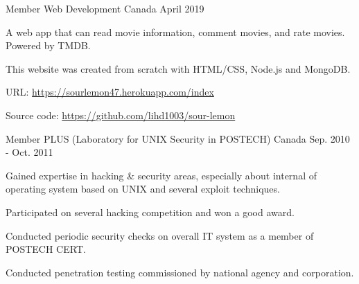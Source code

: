 \begin{cventries}

  \cventry
    {Member} %
    {Web Development} %
    {Canada} %
    {April 2019} %
    {
      \begin{cvitems} %
        \item {A web app that can read movie information, comment movies, and rate movies. Powered by TMDB. }
        \item {This website was created from scratch with HTML/CSS, Node.js and MongoDB.}
        \item {URL: \url{https://sourlemon47.herokuapp.com/index}}
        \item {Source code: \url{https://github.com/lihd1003/sour-lemon}}
      \end{cvitems}
    }

  \cventry
    {Member} %
    {PLUS (Laboratory for UNIX Security in POSTECH)} %
    {Canada} %
    {Sep. 2010 - Oct. 2011} %
    {
      \begin{cvitems} %
        \item {Gained expertise in hacking \& security areas, especially about internal of operating system based on UNIX and several exploit techniques.}
        \item {Participated on several hacking competition and won a good award.}
        \item {Conducted periodic security checks on overall IT system as a member of POSTECH CERT.}
        \item {Conducted penetration testing commissioned by national agency and corporation.}
      \end{cvitems}
    }


\end{cventries}

